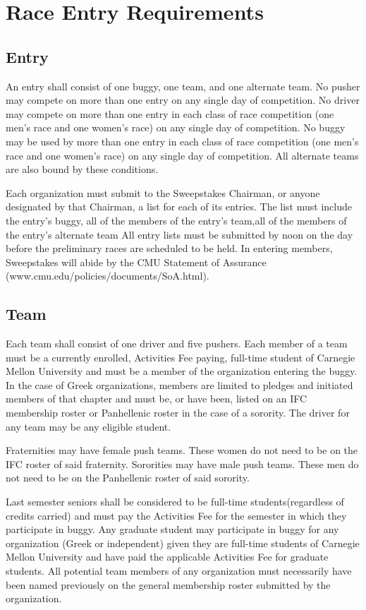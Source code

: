 \documentclass[openany]{book}
\begin{document}
\section{Race Entry Requirements}

\subsection{Entry}
An entry shall consist of one buggy, one team, and one alternate team. No pusher may compete on more than one entry on any single day of competition. No driver may compete on more than one entry in each class of race competition (one men's race and one women's race) on any single day of competition. No buggy may be used by more than one entry in each class of race competition (one men's race and one women's race) on any single day of competition. All alternate teams are also bound by these conditions.

Each organization must submit to the Sweepstakes Chairman, or anyone designated by that Chairman, a list for each of its entries. The list must include the entry's buggy, all of the members of the entry's team,all of the members of the entry's alternate team All entry lists must be submitted by noon on the day before the preliminary races are scheduled to be held.  In entering members, Sweepstakes will abide by the CMU Statement of Assurance (www.cmu.edu/policies/documents/SoA.html).

\subsection{Team}
Each team shall consist of one driver and five pushers. Each member of a team must be a currently enrolled, Activities Fee paying, full-time student of Carnegie Mellon University and must be a member of the organization entering the buggy. In the case of Greek organizations, members are limited to pledges and initiated members of that chapter and must be, or have been, listed on an IFC membership roster or Panhellenic roster in the case of a sorority. The driver for any team may be any eligible student.

Fraternities may have female push teams. These women do not need to be on the IFC roster of said fraternity. Sororities may have male push teams. These men do not need to be on the Panhellenic roster of said sorority.

Last semester seniors shall be considered to be full-time students(regardless of credits carried) and must pay the Activities Fee for the semester in which they participate in buggy. Any graduate student may participate in buggy for any organization (Greek or independent) given they are full-time students of Carnegie Mellon University and have paid the applicable Activities Fee for graduate students. All potential team members of any organization must necessarily have been named previously on the general membership roster submitted by the organization.
\end{document}
